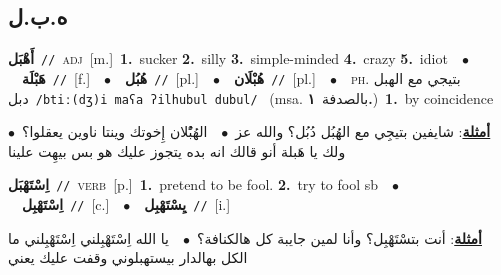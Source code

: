 \documentclass[10pt,a4paper,twoside]{article} %
\begin{document}
\begin{multicols}{2}
\vspace{-3mm}
\subsection*{\color{blue}\foreignlanguage{arabic}{ه.ب.ل}\color{blue}{}} 

{\setlength\topsep{0pt}\textbf{\foreignlanguage{arabic}{أَهْبَل}}\ {\color{gray}\texttt{//}\color{black}}\ \textsc{adj}\ [m.]\ \textbf{1.}~sucker  \textbf{2.}~silly  \textbf{3.}~simple-minded  \textbf{4.}~crazy  \textbf{5.}~idiot\ \ $\bullet$\ \ \setlength\topsep{0pt}\textbf{\foreignlanguage{arabic}{هَبْلَة}}\ {\color{gray}\texttt{//}\color{black}}\ [f.]\ \ $\bullet$\ \ \setlength\topsep{0pt}\textbf{\foreignlanguage{arabic}{هُبُل}}\ {\color{gray}\texttt{//}\color{black}}\ [pl.]\ \ $\bullet$\ \ \setlength\topsep{0pt}\textbf{\foreignlanguage{arabic}{هُبْلَان}}\ {\color{gray}\texttt{//}\color{black}}\ [pl.]\ \ $\bullet$\ \ \textsc{ph.} \color{gray} \foreignlanguage{arabic}{بتيجي مع الهبل دبل}\color{black}\ {\color{gray}\texttt{/{\sffamily btiː(dʒ)i maʕa ʔilhubul dubul}/}\color{black}}\ \color{gray} (msa. \foreignlanguage{arabic}{بالصدفة}~\foreignlanguage{arabic}{\textbf{١.}})\color{black}\ \textbf{1.}~by coincidence\  \begin{flushright}\color{gray}\foreignlanguage{arabic}{\textbf{\underline{\foreignlanguage{arabic}{أمثلة}}}: شايفين بتيجِي مع الهُبُل دُبُل؟ والله عز\ $\bullet$\ \  الهُبُْلان إِخوتك وينتا ناوين يعقلوا؟\ $\bullet$\ \  ولك يا هَبلة أنو قالك انه بده يتجوز عليك هو بس بيهِت علينا}\end{flushright}\color{black}} \vspace{2mm}

{\setlength\topsep{0pt}\textbf{\foreignlanguage{arabic}{اِسْتَهْبَل}}\ {\color{gray}\texttt{//}\color{black}}\ \textsc{verb}\ [p.]\ \textbf{1.}~pretend to be fool.  \textbf{2.}~try to fool sb\ \ $\bullet$\ \ \setlength\topsep{0pt}\textbf{\foreignlanguage{arabic}{اِسْتَهْبِل}}\ {\color{gray}\texttt{//}\color{black}}\ [c.]\ \ $\bullet$\ \ \setlength\topsep{0pt}\textbf{\foreignlanguage{arabic}{يِسْتَهْبِل}}\ {\color{gray}\texttt{//}\color{black}}\ [i.]\  \begin{flushright}\color{gray}\foreignlanguage{arabic}{\textbf{\underline{\foreignlanguage{arabic}{أمثلة}}}: أنت بتسْتَهْبِل؟ وأنا لمين جايبة كل هالكنافة؟\ $\bullet$\ \  يا الله اِسْتَهْبِلني اِسْتَهْبِلني ما الكل بهالدار بيستهبلوني وقفت عليك يعني}\end{flushright}\color{black}} \vspace{2mm}


\end{multicols}
\end{document}
